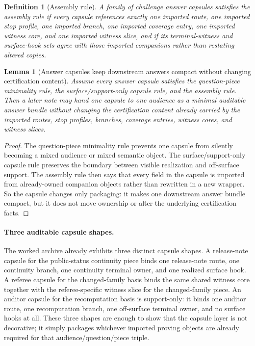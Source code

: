\documentclass[11pt]{article}
\newtheorem{definition}{Definition}
\newtheorem{lemma}{Lemma}
\begin{document}
\begin{definition}[Assembly rule]
A family of challenge answer capsules satisfies the \emph{assembly rule} if every capsule references exactly one imported route, one imported stop profile, one imported branch, one imported coverage entry, one imported witness core, and one imported witness slice, and if its terminal-witness and surface-hook sets agree with those imported companions rather than restating altered copies.
\end{definition}

\begin{lemma}[Answer capsules keep downstream answers compact without changing certification content]
Assume every answer capsule satisfies the question-piece minimality rule, the surface/support-only capsule rule, and the assembly rule.
Then a later note may hand one capsule to one audience as a minimal auditable answer bundle without changing the certification content already carried by the imported routes, stop profiles, branches, coverage entries, witness cores, and witness slices.
\end{lemma}

\begin{proof}
The question-piece minimality rule prevents one capsule from silently becoming a mixed audience or mixed semantic object.
The surface/support-only capsule rule preserves the boundary between visible realization and off-surface support.
The assembly rule then says that every field in the capsule is imported from already-owned companion objects rather than rewritten in a new wrapper.
So the capsule changes only packaging: it makes one downstream answer bundle compact, but it does not move ownership or alter the underlying certification facts.\qedhere
\end{proof}

\paragraph{Three auditable capsule shapes.}
The worked archive already exhibits three distinct capsule shapes.
A release-note capsule for the public-status continuity piece binds one release-note route, one continuity branch, one continuity terminal owner, and one realized surface hook.
A referee capsule for the changed-family basis binds the same shared witness core together with the referee-specific witness slice for the changed-family piece.
An auditor capsule for the recomputation basis is support-only: it binds one auditor route, one recomputation branch, one off-surface terminal owner, and no surface hooks at all.
These three shapes are enough to show that the capsule layer is not decorative; it simply packages whichever imported proving objects are already required for that audience/question/piece triple.
\end{document}
